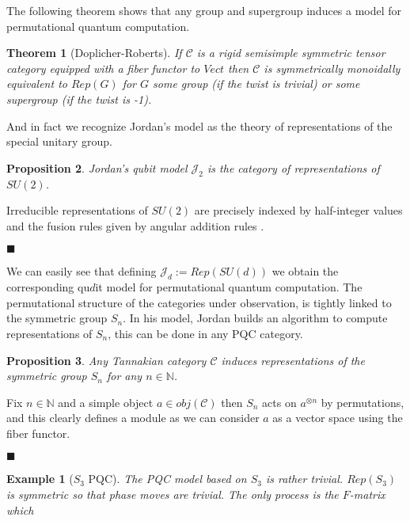 \documentclass{article}
\newtheorem{example}{Example}
\newtheorem{theorem}{Theorem}
\newtheorem{proposition}[theorem]{Proposition}
\newenvironment{proof}[1][Proof]{\begin{trivlist}
\item[\hskip \labelsep {\bfseries #1}]}{\begin{flushright}$\blacksquare$\end{flushright} \end{trivlist}}
\newcommand{\cat}{\mathcal{C}}
\begin{document}
The following theorem shows that any group and supergroup induces a model for permutational quantum computation.
\begin{theorem}[Doplicher-Roberts]
	If $\mathcal{C}$ is a rigid semisimple symmetric tensor category equipped with a fiber functor to $Vect$ then $\mathcal{C}$ is symmetrically monoidally equivalent to $Rep(G)$ for $G$ some group (if the twist is trivial) or some supergroup (if the twist is -1).
\end{theorem}
And in fact we recognize Jordan's model as the theory of representations of the special unitary group.
\begin{proposition}
	Jordan's qubit model $\mathcal{J}_2$ is the category of representations of $SU(2)$.
\end{proposition}
\begin{proof}
	Irreducible representations of $SU(2)$ are precisely indexed by half-integer values and the fusion rules given by angular addition rules \cite{Woit17}.
\end{proof}
We can easily see that defining $\mathcal{J}_d := Rep(SU(d))$ we obtain the corresponding qu$d$it model for permutational quantum computation. The permutational structure of the categories under observation, is tightly linked to the symmetric group $S_n$. In his model, Jordan builds an algorithm to compute representations of $S_n$, this can be done in any PQC category.
\begin{proposition}
	Any Tannakian category $\cat$ induces representations of the symmetric group $S_n$ for any $n\in \mathbb{N}$.
\end{proposition}
\begin{proof}
	Fix $n \in \mathbb{N}$ and a simple object $a \in obj(\cat)$ then $S_n$ acts on $a^{\otimes n}$ by permutations, and this clearly defines a module as we can consider $a$ as a vector space using the fiber functor.
\end{proof}
\begin{example}[$S_3$ PQC]
	The PQC model based on $S_3$ is rather trivial. $Rep(S_3)$ is symmetric so that phase moves are trivial. The only process is the $F$-matrix which 
\end{example}
\end{document}
